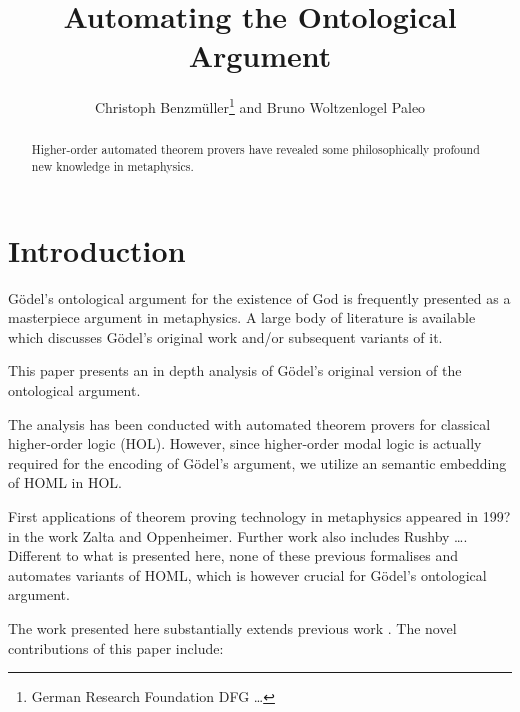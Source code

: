 \documentclass{article}
\title{Automating the Ontological Argument}
\author{Christoph Benzmüller\thanks{German Research Foundation DFG \ldots} and Bruno Woltzenlogel Paleo}
\author{}
\begin{document}
\maketitle

\begin{abstract}
  Higher-order automated theorem provers have revealed some
  philosophically profound new knowledge in metaphysics.
\end{abstract}

\section{Introduction}
G\"{o}del's ontological argument for the existence of God is frequently
presented as a masterpiece argument in metaphysics. A large body of
literature is available which discusses G\"{o}del's original work and/or
subsequent variants of it.

This paper presents an in depth analysis of G\"{o}del's original version
of the ontological argument.   

The analysis has been conducted with automated theorem provers for
classical higher-order logic (HOL). However, since higher-order modal
logic is actually required for the encoding of G\"{o}del's argument, we
utilize an semantic embedding of HOML in HOL.


First applications of theorem proving technology in metaphysics
appeared in 199? in the work Zalta and Oppenheimer.  Further work also
includes Rushby \ldots. Different to what is presented here, none of
these previous formalises and automates variants of HOML, which is
however crucial for G\"{o}del's ontological argument.


The work presented here substantially extends previous work \cite{}.  
The novel contributions of this paper include:
\end{document}
